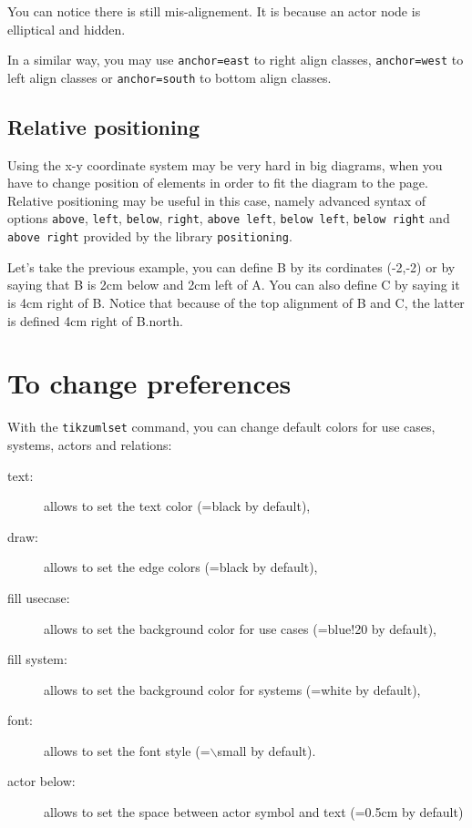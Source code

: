 \documentclass[a4paper,11pt]{report}
\begin{document}
You can notice there is still mis-alignement. It is because an actor node is elliptical and hidden.

\medskip

In a similar way, you may use {\tt anchor=east} to right align classes, {\tt anchor=west} to left align classes or {\tt anchor=south} to bottom align classes.

\subsection{Relative positioning}\label{ss.ucdiagrelpos}

Using the x-y coordinate system may be very hard in big diagrams, when you have to change position of elements in order to fit the diagram to the page. Relative positioning may be useful in this case, namely advanced syntax of options {\tt above}, {\tt left}, {\tt below}, {\tt right}, {\tt above left}, {\tt below left}, {\tt below right} and {\tt above right} provided by the \TikZ library {\tt positioning}.

\medskip

Let's take the previous example, you can define B by its cordinates (-2,-2) or by saying that B is 2cm below and 2cm left of A. You can also define C by saying it is 4cm right of B. Notice that because of the top alignment of B and C, the latter is defined 4cm right of B.north.

\medskip

\begin{minipage}{0.5\textwidth}

\end{minipage}
\begin{minipage}{0.5\textwidth}
\begin{center}
\end{center}
\end{minipage}

\medskip

\section{To change preferences}\label{s.fitusecase}

With the {\tt tikzumlset} command, you can change default colors for use cases, systems, actors and relations:

\begin{description}
\item[text:] allows to set the text color (=black by default),
\item[draw:] allows to set the edge colors (=black by default),
\item[fill usecase:] allows to set the background color for use cases (=blue!20 by default),
\item[fill system:] allows to set the background color for systems (=white by default),
\item[font:] allows to set the font style (=$\backslash$small by default).
\item[actor below:] allows to set the space between actor symbol and text (=0.5cm by default)
\end{description}
\end{document}

